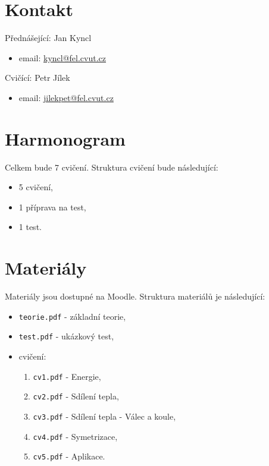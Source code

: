 \documentclass{article}
\begin{document}
\maketitle
\tableofcontents
\newpage




\section{Kontakt}
Přednášející: Jan Kyncl
\begin{itemize}
    \item email: \href{mailto:kyncl@fel.cvut.cz}{kyncl@fel.cvut.cz}
\end{itemize}

Cvičící: Petr Jílek
\begin{itemize}
    \item email: \href{mailto:jilekpet@fel.cvut.cz}{jilekpet@fel.cvut.cz}
\end{itemize}




\section{Harmonogram}
Celkem bude 7 cvičení. Struktura cvičení bude následující:
\begin{itemize}
    \item 5 cvičení,
    \item 1 příprava na test,
    \item 1 test.
\end{itemize}




\section{Materiály}
Materiály jsou dostupné na Moodle. Struktura materiálů je následující:
\begin{itemize}
    \item \texttt{teorie.pdf} - základní teorie,
    \item \texttt{test.pdf} - ukázkový test,
    \item cvičení:
          \begin{enumerate}
              \item \texttt{cv1.pdf} - Energie,
              \item \texttt{cv2.pdf} - Sdílení tepla,
              \item \texttt{cv3.pdf} - Sdílení tepla - Válec a koule,
              \item \texttt{cv4.pdf} - Symetrizace,
              \item \texttt{cv5.pdf} - Aplikace.
          \end{enumerate}
\end{itemize}
\end{document}
